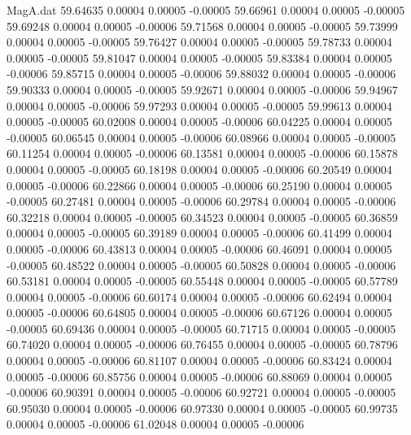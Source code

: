 \begin{filecontents}{MagA.dat}
  59.64635    0.00004    0.00005   -0.00005
  59.66961    0.00004    0.00005   -0.00005
  59.69248    0.00004    0.00005   -0.00006
  59.71568    0.00004    0.00005   -0.00005
  59.73999    0.00004    0.00005   -0.00005
  59.76427    0.00004    0.00005   -0.00005
  59.78733    0.00004    0.00005   -0.00005
  59.81047    0.00004    0.00005   -0.00005
  59.83384    0.00004    0.00005   -0.00006
  59.85715    0.00004    0.00005   -0.00006
  59.88032    0.00004    0.00005   -0.00006
  59.90333    0.00004    0.00005   -0.00005
  59.92671    0.00004    0.00005   -0.00006
  59.94967    0.00004    0.00005   -0.00006
  59.97293    0.00004    0.00005   -0.00005
  59.99613    0.00004    0.00005   -0.00005
  60.02008    0.00004    0.00005   -0.00006
  60.04225    0.00004    0.00005   -0.00005
  60.06545    0.00004    0.00005   -0.00006
  60.08966    0.00004    0.00005   -0.00005
  60.11254    0.00004    0.00005   -0.00006
  60.13581    0.00004    0.00005   -0.00006
  60.15878    0.00004    0.00005   -0.00005
  60.18198    0.00004    0.00005   -0.00006
  60.20549    0.00004    0.00005   -0.00006
  60.22866    0.00004    0.00005   -0.00006
  60.25190    0.00004    0.00005   -0.00005
  60.27481    0.00004    0.00005   -0.00006
  60.29784    0.00004    0.00005   -0.00006
  60.32218    0.00004    0.00005   -0.00005
  60.34523    0.00004    0.00005   -0.00005
  60.36859    0.00004    0.00005   -0.00005
  60.39189    0.00004    0.00005   -0.00006
  60.41499    0.00004    0.00005   -0.00006
  60.43813    0.00004    0.00005   -0.00006
  60.46091    0.00004    0.00005   -0.00005
  60.48522    0.00004    0.00005   -0.00005
  60.50828    0.00004    0.00005   -0.00006
  60.53181    0.00004    0.00005   -0.00005
  60.55448    0.00004    0.00005   -0.00005
  60.57789    0.00004    0.00005   -0.00006
  60.60174    0.00004    0.00005   -0.00006
  60.62494    0.00004    0.00005   -0.00006
  60.64805    0.00004    0.00005   -0.00006
  60.67126    0.00004    0.00005   -0.00005
  60.69436    0.00004    0.00005   -0.00005
  60.71715    0.00004    0.00005   -0.00005
  60.74020    0.00004    0.00005   -0.00006
  60.76455    0.00004    0.00005   -0.00005
  60.78796    0.00004    0.00005   -0.00006
  60.81107    0.00004    0.00005   -0.00006
  60.83424    0.00004    0.00005   -0.00006
  60.85756    0.00004    0.00005   -0.00006
  60.88069    0.00004    0.00005   -0.00006
  60.90391    0.00004    0.00005   -0.00006
  60.92721    0.00004    0.00005   -0.00005
  60.95030    0.00004    0.00005   -0.00006
  60.97330    0.00004    0.00005   -0.00005
  60.99735    0.00004    0.00005   -0.00006
  61.02048    0.00004    0.00005   -0.00006

\end{filecontents}

